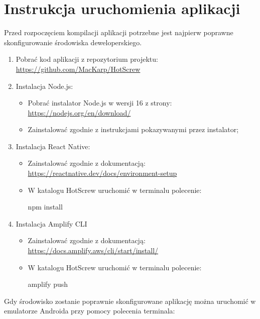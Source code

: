 \documentclass[12pt,a4paper]{article}
\begin{document}
	\section{Instrukcja uruchomienia aplikacji}	
		\indent Przed rozpoczęciem kompilacji aplikacji potrzebne jest najpierw poprawne skonfigurowanie środowiska deweloperskiego.
		\begin{enumerate}
			\item Pobrać kod aplikacji z repozytorium projektu:\\ \url{https://github.com/MacKarp/HotScrew}
			\item Instalacja Node.js:
				\begin{itemize}
					\item Pobrać instalator Node.js w wersji 16 z strony:\\ \url{https://nodejs.org/en/download/} 
					\item Zainstalować zgodnie z instrukcjami pokazywanymi przez instalator;
				\end{itemize}
			\item Instalacja React Native:
				\begin{itemize}
					\item Zainstalować zgodnie z dokumentacją:\\ \url{https://reactnative.dev/docs/environment-setup}
					\item W katalogu HotScrew uruchomić w terminalu polecenie:
			\begin{tcolorbox}[minipage,colback=white,arc=0pt,outer arc=0pt, fontupper=\footnotesize]
				npm install							
			\end{tcolorbox}
				\end{itemize}
			\item Instalacja Amplify CLI
				\begin{itemize}
					\item Zainstalować zgodnie z dokumentacją:\\ \url{https://docs.amplify.aws/cli/start/install/}
					\item W katalogu HotScrew uruchomić w terminalu polecenie: 
					\begin{tcolorbox}[minipage,colback=white,arc=0pt,outer arc=0pt, fontupper=\footnotesize]
						amplify push
					\end{tcolorbox}
				\end{itemize}
		\end{enumerate}
		Gdy środowisko zostanie poprawnie skonfigurowane aplikację można uruchomić w emulatorze Androida przy pomocy polecenia terminala:
\end{document}
